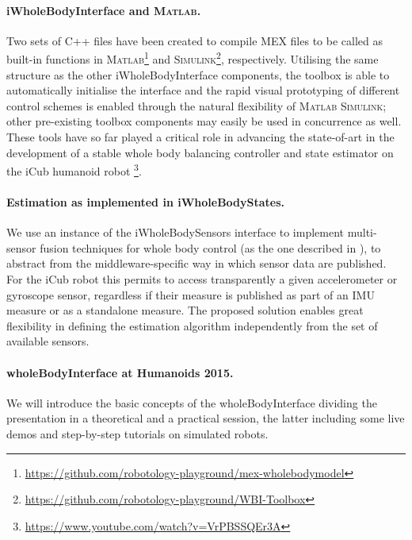 \documentclass[11pt]{article}
\newcommand\textvtt[1]{{\normalfont\fontfamily{cmvtt}\selectfont #1}}
\begin{document}
\paragraph{\textvtt{iWholeBodyInterface} and \textsc{Matlab}.}

Two sets of C++ files have been created to compile {MEX} files to be called as built-in functions in \textsc{Matlab}\footnote{\protect\url{https://github.com/robotology-playground/mex-wholebodymodel}} and \textsc{Simulink}\footnote{\protect\url{https://github.com/robotology-playground/WBI-Toolbox}}, respectively. Utilising the same structure as the other \textvtt{iWholeBodyInterface} components, the toolbox is able to automatically initialise the interface and the rapid visual prototyping of different control schemes is enabled through the natural flexibility of \textsc{Matlab} \textsc{Simulink}; other pre-existing toolbox components may easily be used in concurrence as well. These tools have so far played a critical role in advancing the state-of-art in the development of a stable whole body balancing controller and state estimator on the iCub humanoid robot \footnote{\protect\url{https://www.youtube.com/watch?v=VrPBSSQEr3A}}.


\paragraph{Estimation as implemented in \textvtt{iWholeBodyStates}.}
We use an instance of the \textvtt{iWholeBodySensors} interface to implement multi-sensor fusion techniques for whole body control (as the one described in \cite{nori15}), to abstract from the middleware-specific way in which sensor data are published. For the iCub robot this permits to access transparently a given accelerometer or gyroscope sensor, regardless if their measure is published as part of an IMU measure or as a standalone measure. The proposed solution enables great flexibility in defining the estimation algorithm independently from the set of available sensors.

\paragraph{\textvtt{wholeBodyInterface} at Humanoids 2015.} We will introduce the basic concepts of the \textvtt{wholeBodyInterface} dividing the presentation in a theoretical and a practical session, the latter including some live demos and step-by-step tutorials on simulated robots. 





\end{document}
